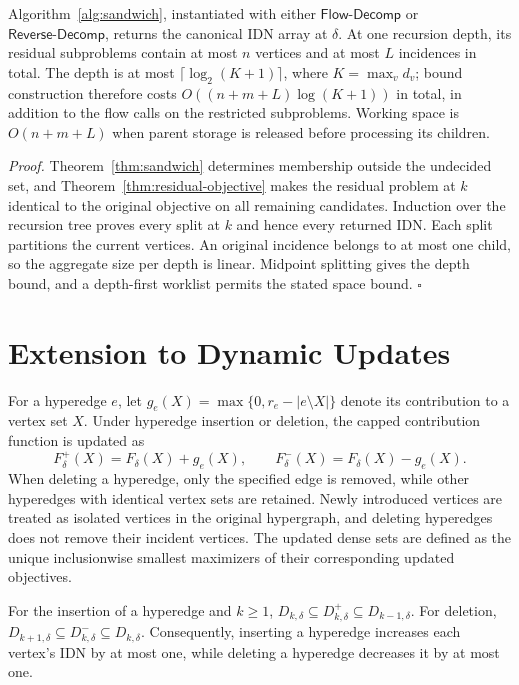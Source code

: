 \documentclass[twocolumn]{svjour3}
\newcommand{\kw}[1]{{\ensuremath{\mathsf{#1}}}\xspace}
\begin{document}
\begin{theorem}\label{thm:sandwich-algorithm}
Algorithm~\ref{alg:sandwich}, instantiated with either \kw{Flow\text{-}Decomp} or \kw{Reverse\text{-}Decomp}, returns the canonical IDN array at $\delta$. At one recursion depth, its residual subproblems contain at most $n$ vertices and at most $L$ incidences in total. The depth is at most $\lceil\log_2(K+1)\rceil$, where $K=\max_v d_v$; bound construction therefore costs $O((n+m+L)\log(K+1))$ in total, in addition to the flow calls on the restricted subproblems. Working space is $O(n+m+L)$ when parent storage is released before processing its children.
\end{theorem}
\emph{Proof.} Theorem~\ref{thm:sandwich} determines membership outside the undecided set, and Theorem~\ref{thm:residual-objective} makes the residual problem at $k$ identical to the original objective on all remaining candidates. Induction over the recursion tree proves every split at $k$ and hence every returned IDN. Each split partitions the current vertices. An original incidence belongs to at most one child, so the aggregate size per depth is linear. Midpoint splitting gives the depth bound, and a depth-first worklist permits the stated space bound. \hfill$\square$




\section{Extension to Dynamic Updates}
For a hyperedge $e$, let $g_e(X)=\max\{0,r_e-|e\setminus X|\}$ denote its contribution to a vertex set $X$. Under hyperedge insertion or deletion, the capped contribution function is updated as
\[
F_\delta^+(X)=F_\delta(X)+g_e(X),\qquad
F_\delta^-(X)=F_\delta(X)-g_e(X).
\]
When deleting a hyperedge, only the specified edge is removed, while other hyperedges with identical vertex sets are retained. Newly introduced vertices are treated as isolated vertices in the original hypergraph, and deleting hyperedges does not remove their incident vertices. The updated dense sets are defined as the unique inclusionwise smallest maximizers of their corresponding updated objectives.

\begin{theorem}\label{thm:dynamic-capped}
For the insertion of a hyperedge and $k\ge1$,
$D_{k,\delta}\subseteq D^+_{k,\delta}
\subseteq D_{k-1,\delta}$.
For deletion,
$D_{k+1,\delta}\subseteq D^-_{k,\delta}
\subseteq D_{k,\delta}$.
Consequently, inserting a hyperedge increases each vertex's IDN by at most one, while deleting a hyperedge decreases it by at most one.
\end{theorem}
\end{document}
